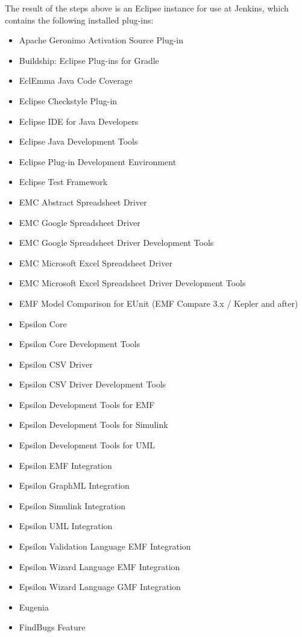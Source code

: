 The result of the steps above is an Eclipse instance for use at Jenkins, which contains the following installed plug-ins:
\begin{itemize}
	\item Apache Geronimo Activation Source Plug-in
  \item Buildship: Eclipse Plug-ins for Gradle
  \item EclEmma Java Code Coverage
  \item Eclipse Checkstyle Plug-in
  \item Eclipse IDE for Java Developers
  \item Eclipse Java Development Tools
  \item Eclipse Plug-in Development Environment
  \item Eclipse Test Framework
  \item EMC Abstract Spreadsheet Driver
  \item EMC Google Spreadsheet Driver
  \item EMC Google Spreadsheet Driver Development Tools
  \item EMC Microsoft Excel Spreadsheet Driver
  \item EMC Microsoft Excel Spreadsheet Driver Development Tools
  \item EMF Model Comparison for EUnit (EMF Compare 3.x / Kepler and after)
  \item Epsilon Core
  \item Epsilon Core Development Tools
  \item Epsilon CSV Driver
  \item Epsilon CSV Driver Development Tools
  \item Epsilon Development Tools for EMF
  \item Epsilon Development Tools for Simulink
  \item Epsilon Development Tools for UML
  \item Epsilon EMF Integration
  \item Epsilon GraphML Integration
  \item Epsilon Simulink Integration
  \item Epsilon UML Integration
  \item Epsilon Validation Language EMF Integration
  \item Epsilon Wizard Language EMF Integration
  \item Epsilon Wizard Language GMF Integration
  \item Eugenia
  \item FindBugs Feature

\end{itemize}
